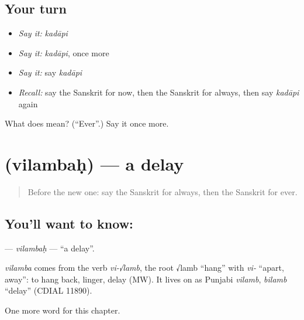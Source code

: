 \subsection*{Your turn}
\begin{itemize}
\raggedright
  \item \emph{Say it:} \emph{kadāpi}
  \item \emph{Say it:} \emph{kadāpi}, once more
  \item \emph{Say it:} say \emph{kadāpi}
  \item \emph{Recall:} say the Sanskrit for now, then the Sanskrit for always, then say \emph{kadāpi} again
\end{itemize}

\begin{tcolorbox}[breakable,colback=teal!4,colframe=teal!35!black,title={Before you move on}]
What does  mean? (\textquotedblleft{}Ever\textquotedblright{}.) Say it once more.
\end{tcolorbox}
\section[\texorpdfstring{\sk{विलम्बः} (vilambaḥ)}{विलम्बः (vilambaḥ)}]{ (vilambaḥ) — a delay}

\label{lesson:SA-C93-vilambah}



\begin{quote}
Before the new one: say the Sanskrit for always, then the Sanskrit for ever.
\end{quote}

\subsection*{You'll want to know: }
\textbf{} — \emph{vilambaḥ} — \textquotedblleft{}a delay\textquotedblright{}.

\begin{cousinweb}
\emph{vilamba} comes from the verb \emph{vi-√lamb}, the root √lamb \textquotedblleft{}hang\textquotedblright{} with \emph{vi-} \textquotedblleft{}apart, away\textquotedblright{}: to hang back, linger, delay (MW). It lives on as Punjabi \emph{vilamb}, \emph{bilamb} \textquotedblleft{}delay\textquotedblright{} (CDIAL 11890).
\end{cousinweb}

\begin{grammarlens}[title={What you've built}]
One more word for this chapter.
\end{grammarlens}

